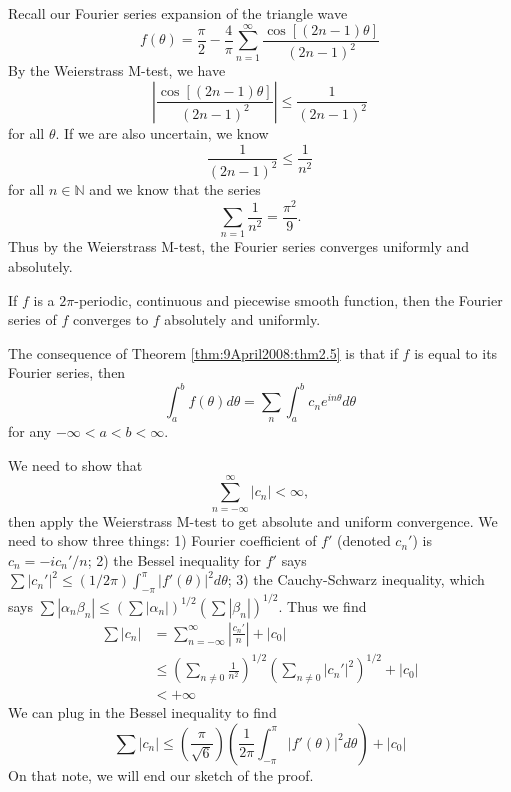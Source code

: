 \begin{ex}
Recall our Fourier series expansion of the triangle wave
\begin{equation}
f(\theta) = \frac{\pi}{2} -
\frac{4}{\pi}\sum^{\infty}_{n=1}\frac{\cos[(2n-1)\theta]}{(2n-1)^2}
\end{equation}
By the Weierstrass M-test, we have
\begin{equation}
\left|\frac{\cos[(2n-1)\theta]}{(2n-1)^{2}}\right|\leq\frac{1}{(2n-1)^2}
\end{equation}
for all $\theta$. If we are also uncertain, we know
\begin{equation}
\frac{1}{(2n-1)^{2}}\leq \frac{1}{n^{2}}
\end{equation}
for all $n\in\mathbb{N}$ and we know that the series
\begin{equation}
\sum_{n=1}\frac{1}{n^{2}}=\frac{\pi^2}{9}.
\end{equation}
Thus by the Weierstrass M-test, the Fourier series converges
uniformly and absolutely.
\end{ex}

\begin{thm}\label{thm:9April2008:thm2.5}
If $f$ is a $2\pi$-periodic, continuous and piecewise smooth
function, then the Fourier series of $f$ converges to $f$
absolutely and uniformly.
\end{thm}

The consequence of Theorem \eqref{thm:9April2008:thm2.5} is
that if $f$ is equal to its Fourier series, then
\begin{equation}
\int^{b}_{a}f(\theta)d\theta =
\sum_{n}\int^{b}_{a}c_{n}e^{in\theta}d\theta
\end{equation}
for any $-\infty<a<b<\infty$.

\begin{sketch}
We need to show that
\begin{equation}
\sum^{\infty}_{n=-\infty}|c_{n}|<\infty,
\end{equation}
then apply the Weierstrass M-test to get absolute and
uniform convergence. We need to show three things: 1)
Fourier coefficient of $f'$ (denoted $c_{n}'$) is
$c_{n}=-ic_{n}'/n$; 2) the Bessel inequality for $f'$ says
$\sum|c_{n}'|^2\leq(1/2\pi)\int^{\pi}_{-\pi}|f'(\theta)|^{2}d\theta$;
3) the Cauchy-Schwarz inequality, which says
$\sum|\alpha_n\beta_n|\leq(\sum|\alpha_n|)^{1/2}(\sum|\beta_n|)^{1/2}$. Thus
we find
\begin{subequations}
\begin{align}
\sum|c_{n}| &= \sum^{\infty}_{n=-\infty}
\left|\frac{c_{n}'}{n}\right|+|c_{0}| \\
&\leq\left(\sum_{n\neq0}\frac{1}{n^{2}}\right)^{1/2}\left(\sum_{n\neq0}|c_{n}'|^{2}\right)^{1/2}
+ |c_0| \\
&<+\infty
\end{align}
\end{subequations}
We can plug in the Bessel inequality to find
\begin{equation}
\sum|c_{n}|\leq\left(\frac{\pi}{\sqrt{6}}\right)\left(\frac{1}{2\pi}\int^{\pi}_{-\pi}|f'(\theta)|^{2}d\theta\right)+|c_{0}|
\end{equation}
On that note, we will end our sketch of the proof.
\end{sketch}


